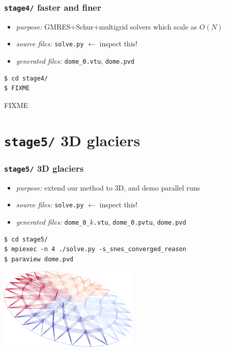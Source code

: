 \documentclass[10pt,hyperref,dvipsnames]{beamer}
\begin{document}
\begin{frame}[fragile]
\frametitle{\texttt{stage4/} \qquad faster and finer}

\begin{itemize}
\item \emph{purpose:} GMRES$+$Schur$+$multigrid solvers which scale as $O(N)$
\item \emph{source files:} \texttt{solve.py} \hfill \alert{$\gets$ inspect this!}
\item \emph{generated files:} \texttt{dome\_0.vtu}, \texttt{dome.pvd}
\end{itemize}

\bigskip
\begin{Verbatim}
$ cd stage4/
$ FIXME
\end{Verbatim}

\bigskip
\begin{center}
FIXME %
\end{center}
\end{frame}


\section{\texttt{stage5/} \qquad 3D glaciers}

\begin{frame}[fragile]
\frametitle{\texttt{stage5/} \qquad 3D glaciers}

\begin{itemize}
\item \emph{purpose:} extend our method to 3D, and demo parallel runs
\item \emph{source files:} \texttt{solve.py} \hfill \alert{$\gets$ inspect this!}
\item \emph{generated files:} \texttt{dome\_0\_}$k$\texttt{.vtu}, \texttt{dome\_0.pvtu}, \texttt{dome.pvd}
\end{itemize}

\bigskip
\begin{Verbatim}
$ cd stage5/
$ mpiexec -n 4 ./solve.py -s_snes_converged_reason
$ paraview dome.pvd
\end{Verbatim}

\bigskip
\begin{center}
\includegraphics[width=0.5\textwidth]{figs/stage5.png}
\end{center}
\end{frame}
\end{document}
